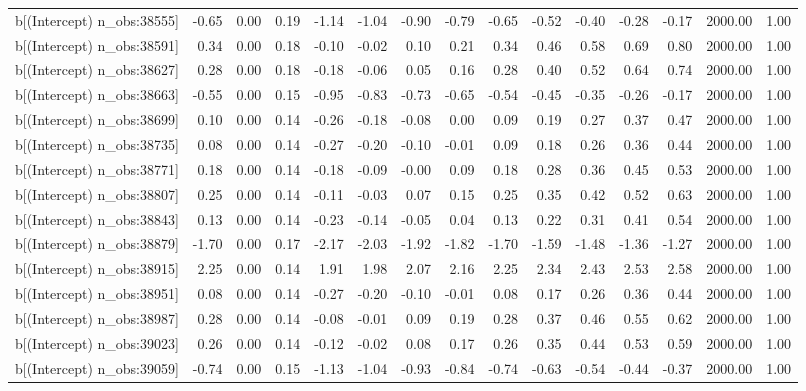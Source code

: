 \begin{table}[ht]
\begin{tabular}{rrrrrrrrrrrrrrr}
  b[(Intercept) n\_obs:38555] & -0.65 & 0.00 & 0.19 & -1.14 & -1.04 & -0.90 & -0.79 & -0.65 & -0.52 & -0.40 & -0.28 & -0.17 & 2000.00 & 1.00 \\ 
  b[(Intercept) n\_obs:38591] & 0.34 & 0.00 & 0.18 & -0.10 & -0.02 & 0.10 & 0.21 & 0.34 & 0.46 & 0.58 & 0.69 & 0.80 & 2000.00 & 1.00 \\ 
  b[(Intercept) n\_obs:38627] & 0.28 & 0.00 & 0.18 & -0.18 & -0.06 & 0.05 & 0.16 & 0.28 & 0.40 & 0.52 & 0.64 & 0.74 & 2000.00 & 1.00 \\ 
  b[(Intercept) n\_obs:38663] & -0.55 & 0.00 & 0.15 & -0.95 & -0.83 & -0.73 & -0.65 & -0.54 & -0.45 & -0.35 & -0.26 & -0.17 & 2000.00 & 1.00 \\ 
  b[(Intercept) n\_obs:38699] & 0.10 & 0.00 & 0.14 & -0.26 & -0.18 & -0.08 & 0.00 & 0.09 & 0.19 & 0.27 & 0.37 & 0.47 & 2000.00 & 1.00 \\ 
  b[(Intercept) n\_obs:38735] & 0.08 & 0.00 & 0.14 & -0.27 & -0.20 & -0.10 & -0.01 & 0.09 & 0.18 & 0.26 & 0.36 & 0.44 & 2000.00 & 1.00 \\ 
  b[(Intercept) n\_obs:38771] & 0.18 & 0.00 & 0.14 & -0.18 & -0.09 & -0.00 & 0.09 & 0.18 & 0.28 & 0.36 & 0.45 & 0.53 & 2000.00 & 1.00 \\ 
  b[(Intercept) n\_obs:38807] & 0.25 & 0.00 & 0.14 & -0.11 & -0.03 & 0.07 & 0.15 & 0.25 & 0.35 & 0.42 & 0.52 & 0.63 & 2000.00 & 1.00 \\ 
  b[(Intercept) n\_obs:38843] & 0.13 & 0.00 & 0.14 & -0.23 & -0.14 & -0.05 & 0.04 & 0.13 & 0.22 & 0.31 & 0.41 & 0.54 & 2000.00 & 1.00 \\ 
  b[(Intercept) n\_obs:38879] & -1.70 & 0.00 & 0.17 & -2.17 & -2.03 & -1.92 & -1.82 & -1.70 & -1.59 & -1.48 & -1.36 & -1.27 & 2000.00 & 1.00 \\ 
  b[(Intercept) n\_obs:38915] & 2.25 & 0.00 & 0.14 & 1.91 & 1.98 & 2.07 & 2.16 & 2.25 & 2.34 & 2.43 & 2.53 & 2.58 & 2000.00 & 1.00 \\ 
  b[(Intercept) n\_obs:38951] & 0.08 & 0.00 & 0.14 & -0.27 & -0.20 & -0.10 & -0.01 & 0.08 & 0.17 & 0.26 & 0.36 & 0.44 & 2000.00 & 1.00 \\ 
  b[(Intercept) n\_obs:38987] & 0.28 & 0.00 & 0.14 & -0.08 & -0.01 & 0.09 & 0.19 & 0.28 & 0.37 & 0.46 & 0.55 & 0.62 & 2000.00 & 1.00 \\ 
  b[(Intercept) n\_obs:39023] & 0.26 & 0.00 & 0.14 & -0.12 & -0.02 & 0.08 & 0.17 & 0.26 & 0.35 & 0.44 & 0.53 & 0.59 & 2000.00 & 1.00 \\ 
  b[(Intercept) n\_obs:39059] & -0.74 & 0.00 & 0.15 & -1.13 & -1.04 & -0.93 & -0.84 & -0.74 & -0.63 & -0.54 & -0.44 & -0.37 & 2000.00 & 1.00 \\ 

\end{tabular}
\end{table}
